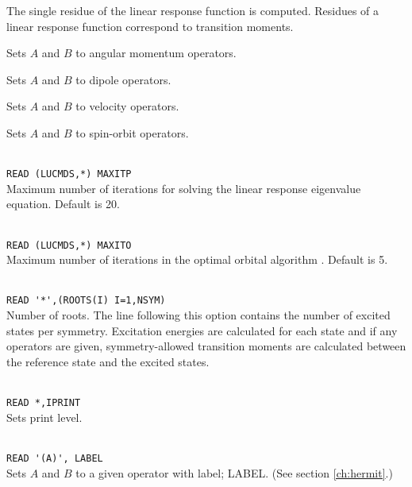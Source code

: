 \begin{description}

\item{}
The single residue of the linear
response function is
computed. Residues of a linear response function correspond to
transition moments.

\item{}
Sets $A$ and $B$ to angular momentum operators.

\item{}
Sets $A$ and $B$ to dipole operators.

\item{}
Sets $A$ and $B$ to velocity operators.

\item{}
Sets $A$ and $B$ to spin-orbit operators.

\item{}\\
\verb|READ (LUCMDS,*) MAXITP|\\
Maximum number of iterations for solving the linear response eigenvalue
equation. Default is 20.

\item{}\\
\verb|READ (LUCMDS,*) MAXITO|\\
Maximum number of iterations in the optimal orbital
algorithm
\cite{tuhjahjajpjjcp84}. 
Default is 5.

\item{}\\
\verb|READ '*',(ROOTS(I) I=1,NSYM)|\\
Number of roots.  The line following this option contains the number
of excited states per symmetry. Excitation
energies are calculated for each state and if
any operators are given, 
symmetry-allowed transition moments are
calculated between the 
reference state and the excited states.

\item{}\\
\verb|READ *,IPRINT|\\
Sets print level.

\item{}\\
\verb|READ '(A)', LABEL|\\
Sets $A$ and $B$ to a given operator with label; LABEL.
(See section \ref{ch:hermit}.)


\end{description}
